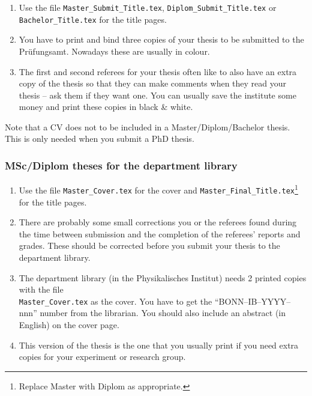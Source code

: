 \begin{enumerate}
\item Use the file \texttt{Master\_Submit\_Title.tex},
  \texttt{Diplom\_Submit\_Title.tex} or
  \texttt{Bachelor\_Title.tex} for the title pages.
\item You have to print and bind three copies of your thesis
  to be submitted to the
  \foreignlanguage{ngerman}{Prüfungsamt}. Nowadays these are usually in
  colour.
\item The first and second referees for your thesis often like to also
  have an extra copy of the thesis so that they can make comments when they read
  your thesis -- ask them if they want one. You can usually save the
  institute some money and print these copies in black \& white.
\end{enumerate}

Note that a CV does not to be included in a Master/Diplom/Bachelor
thesis. This is only needed when you submit a PhD thesis.


\subsubsection{MSc/Diplom theses for the department library}

\begin{enumerate}
\item Use the file \texttt{Master\_Cover.tex} for the cover and
  \texttt{Master\_Final\_Title.tex}\footnote{Replace Master with Diplom
    as appropriate.} for the title pages.
\item There are probably some small corrections you or the referees
  found during the time between submission and the completion of the
  referees' reports and grades. These should be corrected before you
  submit your thesis to the department library.
\item The department
  library (in the Physikalisches
  Institut) needs 2 printed copies with the file\\
  \texttt{Master\_Cover.tex} as the cover. You have to get
  the \enquote{BONN--IB--YYYY--nnn} number from the librarian. You
  should also include an abstract (in English) on the cover page.
\item This version of the thesis is the one that you usually print if
  you need extra copies for your experiment or research group.
\end{enumerate}


